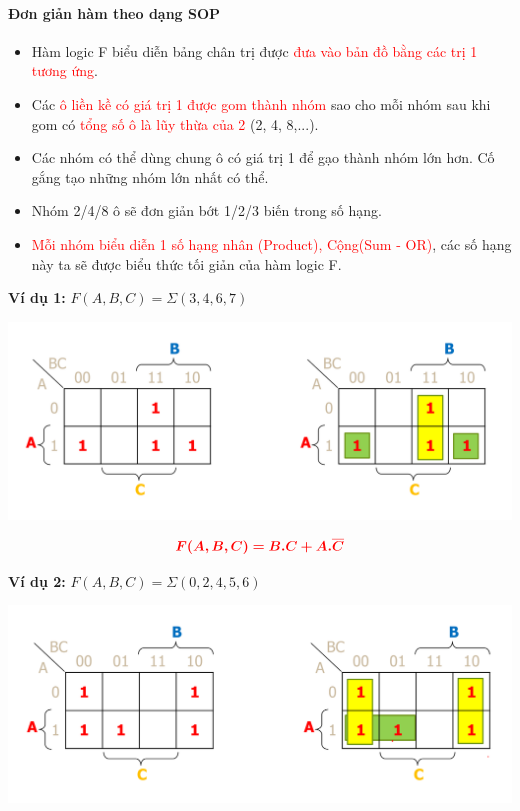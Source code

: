 \documentclass[12pt]{article}
\begin{document}
\begin{sloppypar}
\paragraph{Đơn giản hàm theo dạng SOP}

\begin{itemize}
    \item {Hàm logic F biểu diễn bảng chân trị được \textcolor{red}{đưa vào bản đồ bằng các trị 1 tương ứng}.}
    \item Các \textcolor{red}{ô liền kề có giá trị 1 được gom thành nhóm} sao cho mỗi nhóm sau khi gom có \textcolor{red}{tổng số ô là lũy thừa của 2} (2, 4, 8,...).
    \item Các nhóm có thể dùng chung ô có giá trị 1 để gạo thành nhóm lớn hơn. Cố gắng tạo những nhóm lớn nhất có thể.
    \item Nhóm 2/4/8 ô sẽ đơn giản bớt 1/2/3 biến trong số hạng.
    \item \textcolor{red}{Mỗi nhóm biểu diễn 1 số hạng nhân (Product), Cộng(Sum - OR)}, các số hạng này ta sẽ được biểu thức tối giản của hàm logic F.
\end{itemize}


\begin{tcolorbox}
    \textbf{Ví dụ 1:} \(F(A,B,C) = \Sigma(3,4,6,7)\)
\end{tcolorbox}

\includegraphics[width=15cm]{sop_ex1.png}

\begin{equation*}
    \color{red}
    \bm{F(A,B,C) = B.C + A.\overline{C}}
\end{equation*}

\begin{tcolorbox}
    \textbf{Ví dụ 2:} \(F(A,B,C) = \Sigma(0,2,4,5,6)\)
\end{tcolorbox}

\includegraphics[width=15cm]{sop_ex2.png}


\end{sloppypar}
\end{document}
